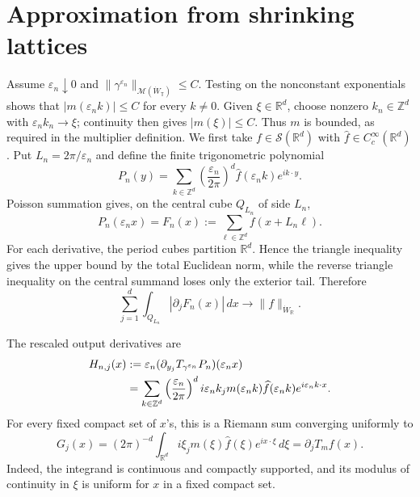 \documentclass[11pt]{article}
\newcommand{\R}{\mathbb R}
\newcommand{\T}{\mathbb T}
\newcommand{\Z}{\mathbb Z}
\newcommand{\M}{\mathcal M}
\newcommand{\eps}{\varepsilon}
\newcommand{\wh}{\widehat}
\begin{document}
\section{Approximation from shrinking lattices}

Assume $\eps_n\downarrow0$ and
$\|\gamma^{\eps_n}\|_{\M(\dot W_{\T})}\le C$.  Testing on the nonconstant
exponentials shows that $|m(\eps_nk)|\le C$ for every $k\ne0$.  Given
$\xi\in\R^d$, choose nonzero $k_n\in\Z^d$ with $\eps_nk_n\to\xi$; continuity
then gives $|m(\xi)|\le C$.  Thus $m$ is bounded, as required in the
multiplier definition.  We first take
$f\in\mathcal S(\R^d)$ with $\wh f\in C_c^\infty(\R^d)$.  Put
$L_n=2\pi/\eps_n$ and define the finite trigonometric polynomial
\begin{equation}\label{eq:Pn}
 P_n(y)=\sum_{k\in\Z^d}
 \left(\frac{\eps_n}{2\pi}\right)^d
 \wh f(\eps_nk)e^{ik\cdot y}.
\end{equation}
Poisson summation gives, on the central cube $Q_{L_n}$ of side $L_n$,
\begin{equation}\label{eq:periodization}
 P_n(\eps_nx)=F_n(x):=\sum_{\ell\in\Z^d}f(x+L_n\ell).
\end{equation}
For each derivative, the period cubes partition $\R^d$.  Hence the triangle
inequality gives the upper bound by the total Euclidean norm, while the
reverse triangle inequality on the central summand loses only the exterior
tail.  Therefore
\begin{equation}\label{eq:input-period}
 \sum_{j=1}^d\int_{Q_{L_n}}|\partial_jF_n(x)|\,dx
 \longrightarrow\|f\|_{\dot W_{\R}}.
\end{equation}

The rescaled output derivatives are
\begin{align}
 H_{n,j}(x)
 &:=\eps_n(\partial_{y_j}T_{\gamma^{\eps_n}}P_n)(\eps_nx)\notag\\
 &=\sum_{k\in\Z^d}\left(\frac{\eps_n}{2\pi}\right)^d
 i\eps_nk_jm(\eps_nk)\wh f(\eps_nk)e^{i\eps_nk\cdot x}.
 \label{eq:Riemann}
\end{align}
For every fixed compact set of $x$'s, this is a Riemann sum converging
uniformly to
\begin{equation}\label{eq:limit-gradient}
 G_j(x)=(2\pi)^{-d}\int_{\R^d}
 i\xi_jm(\xi)\wh f(\xi)e^{ix\cdot\xi}\,d\xi
 =\partial_jT_mf(x).
\end{equation}
Indeed, the integrand is continuous and compactly supported, and its modulus
of continuity in $\xi$ is uniform for $x$ in a fixed compact set.
\end{document}
